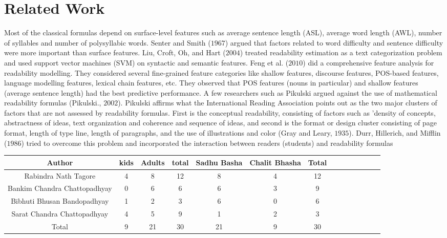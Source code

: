 \documentclass[a4paper,12pt]{book}
\begin{document}
\section{Related Work}
Most of the classical formulas depend on surface-level
features such as average sentence length (ASL), average word length
(AWL), number of syllables and number of polysyllabic words. Senter
and Smith ($1967$) argued that factors related to word difficulty and sentence
difficulty were more important than surface features. Liu, Croft, Oh, and
Hart ($2004$) treated readability estimation as a text categorization problem
and used support vector machines (SVM) on syntactic and semantic features.
Feng et al. ($2010$) did a comprehensive feature analysis for readability
modelling. They considered several fine-grained feature categories like
shallow features, discourse features, POS-based features, language modelling
features, lexical chain features, etc. They observed that POS features
(nouns in particular) and shallow features (average sentence length) had the
best predictive performance.
A few researchers such as Pikulski argued against the use of mathematical
readability formulas (Pikulski., $2002$). Pikulski affirms what the
International Reading Association points out as the two major clusters of
factors that are not assessed by readability formulas. First is the conceptual
readability, consisting of factors such as 'density of concepts, abstractness of
ideas, text organization and coherence and sequence of ideas, and second is
the format or design cluster consisting of page format, length of type line,
length of paragraphs, and the use of illustrations and color (Gray and Leary,
$1935$). Durr, Hillerich, and Mifflin ($1986$) tried to overcome this problem
and incorporated the interaction between readers (students) and readability
formulas \\
\begin{center}
\begin{tabular}{cccccccccccccc}
\hline
\textbf{Author}&\textbf{kids}&\textbf{Adults}&\textbf{total}&\textbf{Sadhu Basha}&\textbf{Chalit Bhasha} &\textbf{Total}\\
\hline
Rabindra Nath Tagore& 4& 8& 12& 8&4 &12\\
Bankim Chandra Chattopadhyay& 0& 6& 6& 6& 3& 9\\
Bibhuti Bhusan Bandopadhyay &1 &2 &3& 6& 0& 6\\
Sarat Chandra Chattopadhyay& 4& 5& 9 &1& 2& 3\\
Total& 9& 21& 30& 21& 9 &30 \\
\hline


\end{tabular}
\end{center}
\end{document}
